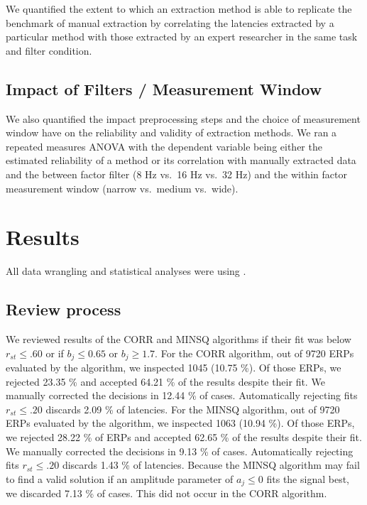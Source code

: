 \documentclass[
  man,floatsintext]{apa7}
\begin{document}
We quantified the extent to which an extraction method is able to replicate the benchmark of manual extraction by correlating the latencies extracted by a particular method with those extracted by an expert researcher in the same task and filter condition.

\hypertarget{impact-of-filters-measurement-window}{%
\subsection{Impact of Filters / Measurement Window}\label{impact-of-filters-measurement-window}}

We also quantified the impact preprocessing steps and the choice of measurement window have on the reliability and validity of extraction methods. We ran a repeated measures ANOVA with the dependent variable being either the estimated reliability of a method or its correlation with manually extracted data and the between factor filter (8 Hz vs.~16 Hz vs.~32 Hz) and the within factor measurement window (narrow vs.~medium vs.~wide).

\hypertarget{results}{%
\section{Results}\label{results}}

All data wrangling and statistical analyses were using .

\hypertarget{review-process}{%
\subsection{Review process}\label{review-process}}

We reviewed results of the CORR and MINSQ algorithms if their fit was below \(r_{st} \le .60\) or if \(b_j \le 0.65\) or \(b_j \ge 1.7\). For the CORR algorithm, out of 9720 ERPs evaluated by the algorithm, we inspected 1045 (10.75 \%). Of those ERPs, we rejected 23.35 \% and accepted 64.21 \% of the results despite their fit. We manually corrected the decisions in 12.44 \% of cases. Automatically rejecting fits \(r_{st} \le .20\) discards 2.09 \% of latencies. For the MINSQ algorithm, out of 9720 ERPs evaluated by the algorithm, we inspected 1063 (10.94 \%). Of those ERPs, we rejected 28.22 \% of ERPs and accepted 62.65 \% of the results despite their fit. We manually corrected the decisions in 9.13 \% of cases. Automatically rejecting fits \(r_{st} \le .20\) discards 1.43 \% of latencies. Because the MINSQ algorithm may fail to find a valid solution if an amplitude parameter of \(a_j \le 0\) fits the signal best, we discarded 7.13 \% of cases. This did not occur in the CORR algorithm.
\end{document}

